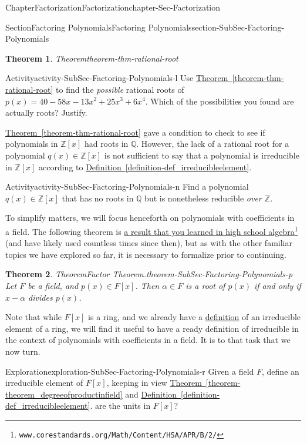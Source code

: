 \documentclass[oneside,10pt,]{book}
\newcommand{\xreffont}{\relax}
\numberwithin{equation}{section}
\def\Z{{\mathbb Z}}
\def\Q{{\mathbb Q}}
\newtheorem{theorem}{Theorem}[section]
\begin{document}
\begin{chapterptx}{Chapter}{Factorization}{}{Factorization}{}{}{chapter-Sec-Factorization}
\begin{sectionptx}{Section}{Factoring Polynomials}{}{Factoring Polynomials}{}{}{section-SubSec-Factoring-Polynomials}
\begin{theorem}{Theorem}{}{}{theorem-thm-rational-root}
\end{theorem}
\begin{activity}{Activity}{}{activity-SubSec-Factoring-Polynomials-l}%
Use \hyperref[theorem-thm-rational-root]{Theorem~{\xreffont\ref{theorem-thm-rational-root}}} to find the \emph{possible} rational roots of \(p(x) = 40-58x-13x^2+25x^3+6x^4\). Which of the possibilities you found are actually roots? Justify.%
\end{activity}%
\hyperref[theorem-thm-rational-root]{Theorem~{\xreffont\ref{theorem-thm-rational-root}}} gave a condition to check to see if polynomials in \(\Z[x]\) had roots in \(\Q\). However, the lack of a rational root for a polynomial \(q(x)\in \Z[x]\) is not sufficient to say that a polynomial is irreducible in \(\Z[x]\) according to \hyperref[definition-def_irreducibleelement]{Definition~{\xreffont\ref{definition-def_irreducibleelement}}}.%
\begin{activity}{Activity}{}{activity-SubSec-Factoring-Polynomials-n}%
Find a polynomial \(q(x) \in \Z[x]\) that has no roots in \(\Q\) but is nonetheless reducible \emph{over \(\Z\)}.%
\end{activity}%
To simplify matters, we will focus henceforth on polynomials with coefficients in a field. The following theorem is \href{http://www.corestandards.org/Math/Content/HSA/APR/B/2/}{a result that you learned in high school algebra}\footnote{\nolinkurl{www.corestandards.org/Math/Content/HSA/APR/B/2/}\label{fn-SubSec-Factoring-Polynomials-o-b}} (and have likely used countless times since then), but as with the other familiar topics we have explored so far, it is necessary to formalize prior to continuing.%
\begin{theorem}{Theorem}{Factor Theorem.}{}{theorem-SubSec-Factoring-Polynomials-p}%
Let \(F\) be a field, and \(p(x)\in F[x]\). Then \(\alpha\in F\) is a root of \(p(x)\) if and only if \(x-\alpha\) divides \(p(x)\).%
\end{theorem}
Note that while \(F[x]\) is a ring, and we already have a \hyperref[definition-def_irreducibleelement]{definition} of an irreducible element of a ring, we will find it useful to have a ready definition of irreducible in the context of polynomials with coefficients in a field. It is to that task that we now turn.%
\begin{exploration}{Exploration}{}{exploration-SubSec-Factoring-Polynomials-r}%
%
Given a field \(F\), define an irreducible element of \(F[x]\), keeping in view \hyperref[theorem-theorem_degreeofproductinfield]{Theorem~{\xreffont\ref{theorem-theorem_degreeofproductinfield}}} and \hyperref[definition-def_irreducibleelement]{Definition~{\xreffont\ref{definition-def_irreducibleelement}}}. \noindentWhat are the units in \(F[x]\)?%

\end{exploration}
\end{sectionptx}
\end{chapterptx}
\end{document}
